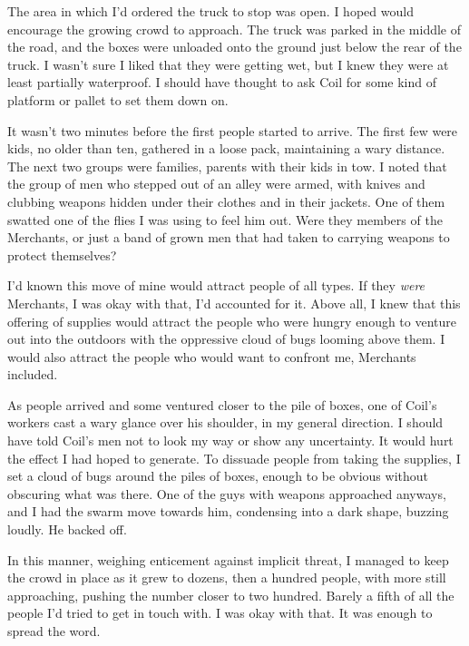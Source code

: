 The area in which I'd ordered the truck to stop was open.  I hoped would encourage the growing crowd to approach.  The truck was parked in the middle of the road, and the boxes were unloaded onto the ground just below the rear of the truck.  I wasn't sure I liked that they were getting wet, but I knew they were at least partially waterproof.  I should have thought to ask Coil for some kind of platform or pallet to set them down on.



It wasn't two minutes before the first people started to arrive.  The first few were kids, no older than ten, gathered in a loose pack, maintaining a wary distance.  The next two groups were families, parents with their kids in tow.  I noted that the group of men who stepped out of an alley were armed, with knives and clubbing weapons hidden under their clothes and in their jackets.  One of them swatted one of the flies I was using to feel him out.  Were they members of the Merchants, or just a band of grown men that had taken to carrying weapons to protect themselves?



I'd known this move of mine would attract people of all types.  If they \emph{were} Merchants, I was okay with that, I'd accounted for it.  Above all, I knew that this offering of supplies would attract the people who were hungry enough to venture out into the outdoors with the oppressive cloud of bugs looming above them.  I would also attract the people who would want to confront me, Merchants included.



As people arrived and some ventured closer to the pile of boxes, one of Coil's workers cast a wary glance over his shoulder, in my general direction.  I should have told Coil's men not to look my way or show any uncertainty.  It would hurt the effect I had hoped to generate.  To dissuade people from taking the supplies, I set a cloud of bugs around the piles of boxes, enough to be obvious without obscuring what was there.   One of the guys with weapons approached anyways, and I had the swarm move towards him, condensing into a dark shape, buzzing loudly.  He backed off.



In this manner, weighing enticement against implicit threat, I managed to keep the crowd in place as it grew to dozens, then a hundred people, with more still approaching, pushing the number closer to two hundred.  Barely a fifth of all the people I'd tried to get in touch with.  I was okay with that.  It was enough to spread the word.



